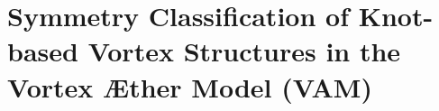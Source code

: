 \documentclass{article}
\begin{document}
\section{Symmetry Classification of Knot-based Vortex Structures in the Vortex Æther Model (VAM)}

\begin{table}[H]
\caption{
\textbf{Known Symmetries of Prime Knots as VAM Vortex Structures.}
This table catalogs the discrete symmetries of low-crossing-number prime knots, interpreted as possible stable knotted vortex configurations in the Vortex Æther Model (VAM). Columns show the principal symmetry groups ($D_2(r)$, $D_{2k}$, $Z_{2k}$, $I$), reversibility, amphichirality, allowed periods, and the full symmetry group (FSG).
}
\centering

\renewcommand{\arraystretch}{1.15}
\setlength{\tabcolsep}{0.45em}

\begin{longtable}{lcccccccc}


\end{longtable}
\end{table}
\end{document}
